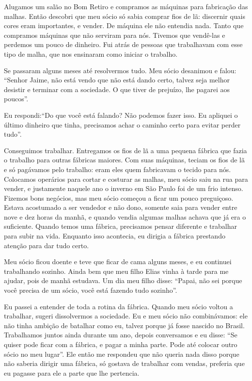 Alugamos um salão no Bom Retiro e compramos as máquinas para
fabricação das malhas. Então descobri que meu sócio só
sabia comprar fios de lã: discernir quais cores eram importantes, e vender.
De máquina ele não entendia nada. Tanto que compramos máquinas que não serviram
para nós. Tivemos que vendê-las e perdemos um pouco de dinheiro. Fui atrás de pessoas que trabalhavam com esse tipo de malha, que nos ensinaram como iniciar o trabalho.

Se passaram alguns meses até resolvermos tudo. Meu sócio desanimou e
falou: ``Senhor Jaime, não está vendo que não está dando certo,
talvez seja melhor desistir e terminar com a sociedade. O que tiver de
prejuízo, lhe pagarei aos poucos''.

Eu respondi:``Do que você está falando? Não podemos fazer isso. Eu
apliquei o último dinheiro que tinha, precisamos achar o caminho certo
para evitar perder tudo''.

Conseguimos trabalhar. Entregamos os fios de lã a uma pequena fábrica
que fazia o trabalho para outras fábricas maiores. Com suas máquinas,
teciam os fios de lã e só pagávamos pelo trabalho: eram eles quem fabricavam
o tecido para nós. Colocamos operários para cortar e costurar as malhas,
meu sócio saiu na rua para vender, e justamente naquele ano o inverno em São Paulo foi
de um frio intenso. Fizemos bons negócios, mas meu sócio
começou a ficar um pouco preguiçoso. Estava acostumado a ser vendedor
e não dono, somente saia para vender entre nove e dez horas da manhã, e
quando vendia algumas malhas achava que já era o suficiente. Quando
temos uma fábrica, precisamos pensar diferente e trabalhar para subir na
vida. Enquanto isso acontecia, eu dirigia a fábrica prestando
atenção para dar tudo certo.

Meu sócio ficou doente e teve que ficar de cama alguns meses, e eu
continuei trabalhando sozinho. Ainda bem que meu filho Elias vinha à
tarde para me ajudar, pois de manhã estudava. Um dia meu filho
disse: ``Papai, não sei porque você precisa de um sócio, você está
fazendo tudo sozinho''.

Eu passei a entender de toda a rotina da fábrica. Quando meu sócio voltou a
trabalhar, sugeri dissolvermos a sociedade. Eu e
meu sócio não combinávamos: ele não tinha ambição de batalhar como eu,
talvez porque já fosse nascido no Brasil. Trabalhamos juntos
ainda durante um ano, depois conversamos e eu disse: ``Se quiser
pode ficar com a fábrica, e pagar a minha parte. Pode até colocar outro
sócio no meu lugar''. Ele então me respondeu que não queria nada disso
porque não saberia dirigir uma fábrica, só gostava de trabalhar com
vendas, preferia que eu pagasse para ele a parte que lhe pertencia.

